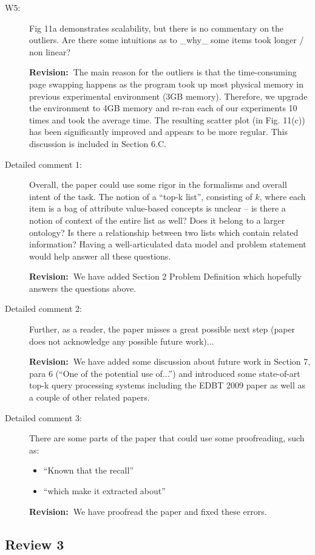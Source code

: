\documentclass[11pt]{article}
\newcommand{\rv}{\textbf{Revision:~}}
\begin{document}
\begin{description}
\item[W5:] Fig 11a demonstrates scalability, but there is no commentary on the
outliers. Are there some intuitions as to \_why\_ some items took longer / non
linear?

\rv The main reason for the outliers is that the
time-consuming page swapping happens as the program took up most
physical memory in previous experimental environment (3GB memory).
Therefore, we upgrade the environment to 4GB memory and re-ran
each of our experiments 10 times and took the average time. The resulting
scatter plot (in Fig. 11(c)) has been significantly improved and appears to
be more regular. This discussion is included in Section 6.C.

\item[Detailed comment 1:]
Overall, the paper could use some rigor in the formalisms and overall
intent of the task. The notion of a ``top-k list'', consisting of $k$, where
each item is a bag of attribute value-based concepts is unclear -- is there
a notion of context of the entire list as well? Does it belong to a larger
ontology? Is there a relationship between two lists which contain related
information? Having a well-articulated data model and problem statement
would help answer all these questions.

\rv We have added Section 2 Problem Definition which hopefully answers
the questions above.

\item[Detailed comment 2:]
Further, as a reader, the paper misses a great possible next step (paper
does not acknowledge any possible future work)...

\rv We have added some discussion about future work in
Section 7, para 6 (``One of the potential use of...'') and introduced
some state-of-art top-k query processing systems including the EDBT
2009 paper as well as a couple of other related papers.

\item[Detailed comment 3:]
There are some parts of the paper that could use some proofreading, such
as:
\begin{itemize}
\item ``Known that the recall''
\item ``which make it extracted about''
\end{itemize}

\rv We have proofread the paper and fixed these errors.
\end{description}

\subsection*{Review 3}
\end{document}
